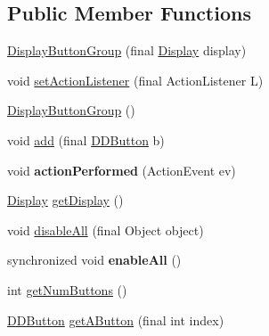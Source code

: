 \subsection*{Public Member Functions}
\begin{DoxyCompactItemize}
\item 
\hyperlink{classgov_1_1fnal_1_1ppd_1_1dd_1_1util_1_1DisplayButtonGroup_a628fcdbe99086050bfb9330f5884885d}{Display\-Button\-Group} (final \hyperlink{interfacegov_1_1fnal_1_1ppd_1_1dd_1_1signage_1_1Display}{Display} display)
\item 
void \hyperlink{classgov_1_1fnal_1_1ppd_1_1dd_1_1util_1_1DisplayButtonGroup_aff590ec2454274430d3d1d4ccb4e3908}{set\-Action\-Listener} (final Action\-Listener L)
\item 
\hyperlink{classgov_1_1fnal_1_1ppd_1_1dd_1_1util_1_1DisplayButtonGroup_a003106629408dbb253941e2fcc4f072f}{Display\-Button\-Group} ()
\item 
void \hyperlink{classgov_1_1fnal_1_1ppd_1_1dd_1_1util_1_1DisplayButtonGroup_aea209fc7486f839c17551ea5d126c8b4}{add} (final \hyperlink{classgov_1_1fnal_1_1ppd_1_1dd_1_1changer_1_1DDButton}{D\-D\-Button} b)
\item 
\hypertarget{classgov_1_1fnal_1_1ppd_1_1dd_1_1util_1_1DisplayButtonGroup_a2fdcfdeab05400e40eafe6f0afbd254b}{void {\bfseries action\-Performed} (Action\-Event ev)}\label{classgov_1_1fnal_1_1ppd_1_1dd_1_1util_1_1DisplayButtonGroup_a2fdcfdeab05400e40eafe6f0afbd254b}

\item 
\hyperlink{interfacegov_1_1fnal_1_1ppd_1_1dd_1_1signage_1_1Display}{Display} \hyperlink{classgov_1_1fnal_1_1ppd_1_1dd_1_1util_1_1DisplayButtonGroup_a26958c7d02d984388afdce9bb0fddd66}{get\-Display} ()
\item 
void \hyperlink{classgov_1_1fnal_1_1ppd_1_1dd_1_1util_1_1DisplayButtonGroup_a5894e1f01e08a0b5f57589eeffd53367}{disable\-All} (final Object object)
\item 
\hypertarget{classgov_1_1fnal_1_1ppd_1_1dd_1_1util_1_1DisplayButtonGroup_a75da48ccd352d5f4f2fcc59dfabee189}{synchronized void {\bfseries enable\-All} ()}\label{classgov_1_1fnal_1_1ppd_1_1dd_1_1util_1_1DisplayButtonGroup_a75da48ccd352d5f4f2fcc59dfabee189}

\item 
int \hyperlink{classgov_1_1fnal_1_1ppd_1_1dd_1_1util_1_1DisplayButtonGroup_ad5a3d425e222f388ee90114f83307eeb}{get\-Num\-Buttons} ()
\item 
\hyperlink{classgov_1_1fnal_1_1ppd_1_1dd_1_1changer_1_1DDButton}{D\-D\-Button} \hyperlink{classgov_1_1fnal_1_1ppd_1_1dd_1_1util_1_1DisplayButtonGroup_a4199ff481f806c60516df3447823079a}{get\-A\-Button} (final int index)
\end{DoxyCompactItemize}


